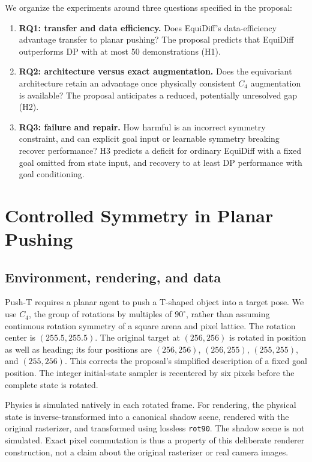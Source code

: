 We organize the experiments around three questions specified in the proposal:
\begin{enumerate}
 \item \textbf{RQ1: transfer and data efficiency.} Does EquiDiff's
 data-efficiency advantage transfer to planar pushing? The proposal predicts
 that EquiDiff outperforms DP with at most 50 demonstrations (H1).
 \item \textbf{RQ2: architecture versus exact augmentation.} Does the
 equivariant architecture retain an advantage once physically consistent
 $C_4$ augmentation is available? The proposal anticipates a reduced,
 potentially unresolved gap (H2).
 \item \textbf{RQ3: failure and repair.} How harmful is an incorrect symmetry
 constraint, and can explicit goal input or learnable symmetry breaking
 recover performance? H3 predicts a deficit for ordinary EquiDiff with a
 fixed goal omitted from state input, and recovery to at least DP performance
 with goal conditioning.
\end{enumerate}

\section{Controlled Symmetry in Planar Pushing}
\label{eqstudy:sec:method}
\subsection{Environment, rendering, and data}
Push-T requires a planar agent to push a T-shaped object into a target pose.
We use $C_4$, the group of rotations by multiples of $90^\circ$, rather than
assuming continuous rotation symmetry of a square arena and pixel lattice.
The rotation center is $(255.5,255.5)$. The original target at $(256,256)$
is rotated in position as well as heading; its four positions are
$(256,256)$, $(256,255)$, $(255,255)$, and $(255,256)$.
This corrects the proposal's simplified description of a fixed goal position.
The integer initial-state sampler is recentered by six pixels before the
complete state is rotated.

Physics is simulated natively in each rotated frame. For rendering, the
physical state is inverse-transformed into a canonical shadow scene,
rendered with the original rasterizer, and transformed using lossless
\texttt{rot90}. The shadow scene is not simulated. Exact pixel commutation
is thus a property of this deliberate renderer construction, not a claim
about the original rasterizer or real camera images.

